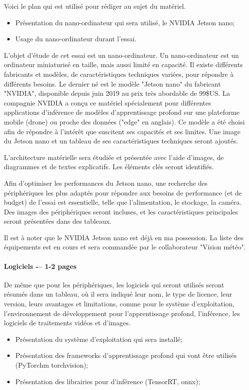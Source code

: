 \par Voici le plan qui est utilisé pour rédiger au sujet du matériel.
\begin{itemize}
   \item Présentation du nano-ordinateur qui sera utilisé, le NVIDIA Jetson nano;
   \item Usage du nano-ordinateur durant l'essai.
\end{itemize}

\par L'objet d'étude de cet essai est un nano-ordinateur. Un nano-ordinateur est un ordinateur miniaturisé en taille, mais aussi limité en capacité. Il existe différents fabricants et modèles, de caractéristiques techniques variées, pour répondre à différents besoins. Le dernier né est le modèle "Jetson nano" du fabricant "NVIDIA", disponible depuis juin 2019 au prix très abordable de 99\$US. La compagnie NVIDIA a conçu ce matériel spécialement pour différentes applications d'inférence de modèles d'apprentissage profond sur une plateforme mobile (drone) ou proche des données ("edge" en anglais). Ce modèle a été choisi afin de répondre à l'intérêt que suscitent ses capacités et ses limites. Une image du Jetson nano et un tableau de ses caractéristiques techniques seront ajoutés. 
\par L'architecture matérielle sera étudiée et présentée avec l'aide d'images, de diagrammes et de textes explicatifs. Les éléments clés seront identifiés.
\par Afin d'optimiser les performances du Jetson nano, une recherche des périphériques les plus adaptés pour répondre aux besoins de performance (et de budget) de l'essai est essentielle, telle que l'alimentation, le stockage, la caméra. Des images des périphériques seront incluses, et les caractéristiques principales seront présentées dans des tableaux.
\par Il est à noter que le NVIDIA Jetson nano est déjà en ma possession. La liste des équipements est en cours et sera commandée par le collaborateur "Vision météo".

\paragraph{Logiciels -– 1-2 pages}
\par De même que pour les périphériques, les logiciels qui seront utilisés seront résumés dans un tableau, où il sera indiqué leur nom, le type de licence, leur version, leurs avantages et limitations, comme pour le système d'exploitation, l'environnement de développement pour l'apprentissage profond, l'inférence, les logiciels de traitements vidéos et d'images. 
\begin{itemize}
   \item Présentation du système d'exploitation qui sera installé;
   \item Présentation des frameworks d’apprentissage profond qui vont être utilisés (PyTorchm torchvision);
   \item Présentation des librairies pour d'inférence (TensorRT, onnx);
\end{itemize}
\vspace{1\baselineskip}
\par 